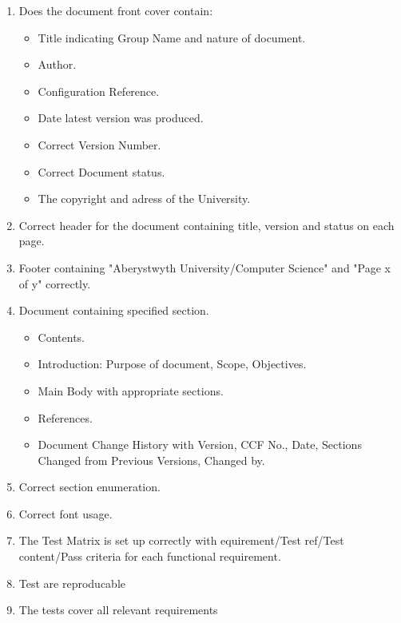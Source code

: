 \documentclass{project}
\begin{document}
\begin{enumerate}
	\item Does the document front cover contain:
	
	\begin{itemize}
		\item Title indicating Group Name and nature of document.
		\item Author.
		\item Configuration Reference.
		\item Date latest version was produced.
		\item Correct Version Number.
		\item Correct Document status.
		\item The copyright and adress of the University.
	\end{itemize}
	
	\item Correct header for the document containing title, version and status on each page.
	\item Footer containing "Aberystwyth University/Computer Science" and "Page x of y" correctly.
	\item Document containing specified section.
	
	\begin{itemize}
		\item Contents.
		\item Introduction: Purpose of document, Scope, Objectives.
		\item Main Body with appropriate sections.
		\item References.
		\item Document Change History with Version, CCF No., Date, Sections Changed from Previous Versions, Changed by.
	\end{itemize}
	
	\item Correct section enumeration.
	\item Correct font usage.
	
	
	
	\item The Test Matrix is set up correctly with equirement/Test ref/Test content/Pass criteria for each functional requirement.
	\item Test are reproducable
	\item The tests cover all relevant requirements
	
\end{enumerate}
\end{document}
